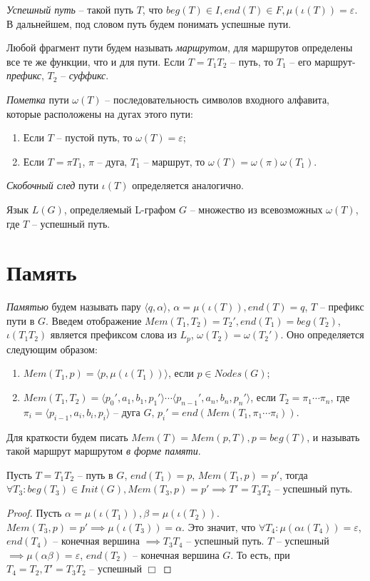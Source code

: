 \emph{Успешный путь} -- такой путь $T$, что $beg(T) \in I, end(T) \in F, \mu(\iota(T)) = \varepsilon$.
В дальнейшем, под словом путь будем понимать успешные пути.

Любой фрагмент пути будем называть \emph{маршрутом}, для маршрутов определены все те же функции, что и для пути.
Если $T = T_1 T_2$ -- путь, то $T_1$ -- его маршрут-\emph{префикс}, $T_2$ -- \emph{суффикс}.

\emph{Пометка} пути $\omega(T)$ -- последовательность символов входного алфавита, которые расположены на дугах этого пути:
\begin{enumerate}[label=\arabic*)]
    \item Если $T$ -- пустой путь, то $\omega(T) = \varepsilon$;
    \item Если $T = \pi T_1$, $\pi$ -- дуга, $T_1$ -- маршрут, то $\omega(T) = \omega(\pi) \omega(T_1)$.
\end{enumerate}

\emph{Скобочный след} пути $\iota(T)$ определяется аналогично.

Язык $L(G)$, определяемый L-графом $G$ -- множество из всевозможных $\omega(T)$, где $T$ -- успешный путь.

\section{Память}
\emph{Памятью} будем называть пару $\langle q, \alpha \rangle$, $\alpha=\mu(\iota(T)), end(T)=q$, $T$ --  префикс пути в $G$. 
Введем отображение $Mem(T_1,T_2) = T_2', end(T_1) = beg(T_2)$, $\iota(T_1 T_2)$ является префиксом слова из $L_p$, $\omega(T_2) = \omega(T_2')$.
Оно определяется следующим образом:
\begin{enumerate}[label=\arabic*)]
    \item $Mem(T_1, p) = \langle p, \mu(\iota(T_1)) \rangle$, если $p \in Nodes(G)$;
    \item {
        $Mem(T_1, T_2) = \langle p_0', a_1, b_1, p_1' \rangle \cdots \langle p_{n-1}', a_n, b_n, p_n' \rangle$, если $T_2 =\pi_1 \cdots \pi_n$, 
        где $\pi_i = \langle p_{i-1}, a_i, b_i, p_i \rangle$ -- дуга $G$, $p_i' = end(Mem(T_1, \pi_1 \cdots \pi_i))$.
    }
\end{enumerate}

Для краткости будем писать $Mem(T) = Mem(p, T), p = beg(T)$, и называть такой маршрут маршрутом \emph{в форме памяти}. 

\begin{lemma}
    \label{mem_continue_lemma}
    Пусть $T=T_1 T_2$ -- путь в $G$, $end(T_1) = p$, $Mem(T_1, p) = p'$, тогда $\forall T_3 : beg(T_3) \in Init(G), Mem(T_3, p) = p' \implies T' = T_3 T_2$ -- успешный путь. 
\end{lemma}
\begin{proof}
    Пусть $\alpha = \mu(\iota(T_1)), \beta = \mu(\iota(T_2))$.
    $Mem(T_3, p) = p' \implies \mu(\iota(T_3)) = \alpha$.
    Это значит, что $\forall T_4 : \mu(\alpha \iota(T_4)) = \varepsilon$, $end(T_4)$ -- конечная вершина  $\implies T_3 T_4$ -- успешный путь.
    $T$ -- успешный $\implies \mu(\alpha \beta) = \varepsilon$, $end(T_2)$ -- конечная вершина $G$. 
    То есть, при $T_4 = T_2, T' = T_3 T_2$ -- успешный $\Box$ 
\end{proof}

